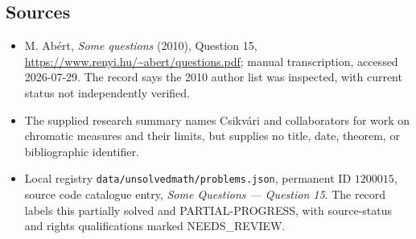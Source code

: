 \documentclass[11pt]{article}
\begin{document}
\subsection{Sources}
\begin{itemize}
\item M. Ab\'ert, \emph{Some questions} (2010), Question 15, \url{https://www.renyi.hu/~abert/questions.pdf}; manual transcription, accessed 2026-07-29. The record says the 2010 author list was inspected, with current status not independently verified.
\item The supplied research summary names Csikv\'ari and collaborators for work on chromatic measures and their limits, but supplies no title, date, theorem, or bibliographic identifier.
\item Local registry \texttt{data/unsolvedmath/problems.json}, permanent ID $1200015$, source code catalogue entry, \emph{Some Questions --- Question 15}. The record labels this partially solved and PARTIAL-PROGRESS, with source-status and rights qualifications marked NEEDS\_REVIEW.
\end{itemize}
\end{document}
